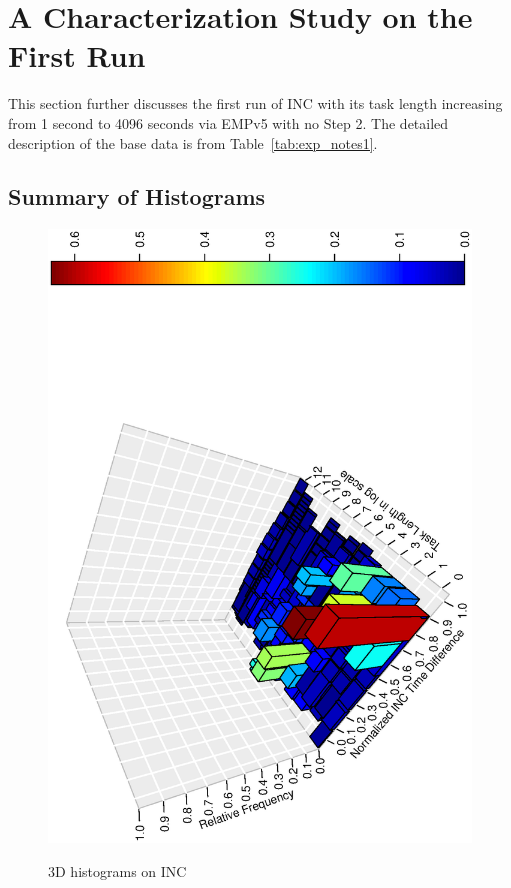 \section{A Characterization Study on the First Run~\label{sec:sodb9_r3_hist}} 
This section further discusses the first run of 
INC with its task length increasing from 1 second to 4096 seconds via EMPv5 with no Step 2. 
The detailed description of the base data is from Table~\ref{tab:exp_notes1}.

\subsection{Summary of Histograms}

\begin{figure}[hp!]
\vspace{-.3in}
	\centering
	\includegraphics[scale=0.5,angle=270]{u_s_time/3d_plot.eps}\label{fig:3d_plot}
	\caption{3D histograms on INC~\label{fig:hist3d}}
\end{figure}

